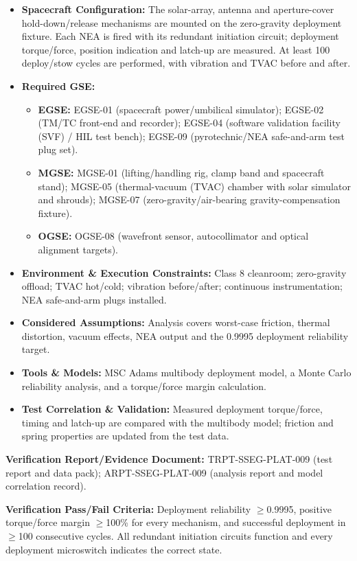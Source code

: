 \begin{itemize}
\item \textbf{Spacecraft Configuration:} The solar-array, antenna and aperture-cover hold-down/release mechanisms are mounted on the zero-gravity deployment fixture. Each NEA is fired with its redundant initiation circuit; deployment torque/force, position indication and latch-up are measured. At least 100 deploy/stow cycles are performed, with vibration and TVAC before and after.
\item \textbf{Required GSE:}
\begin{itemize}
\item \textbf{EGSE:} EGSE-01 (spacecraft power/umbilical simulator); EGSE-02 (TM/TC front-end and recorder); EGSE-04 (software validation facility (SVF) / HIL test bench); EGSE-09 (pyrotechnic/NEA safe-and-arm test plug set).
\item \textbf{MGSE:} MGSE-01 (lifting/handling rig, clamp band and spacecraft stand); MGSE-05 (thermal-vacuum (TVAC) chamber with solar simulator and shrouds); MGSE-07 (zero-gravity/air-bearing gravity-compensation fixture).
\item \textbf{OGSE:} OGSE-08 (wavefront sensor, autocollimator and optical alignment targets).
\end{itemize}
\item \textbf{Environment \& Execution Constraints:} Class 8 cleanroom; zero-gravity offload; TVAC hot/cold; vibration before/after; continuous instrumentation; NEA safe-and-arm plugs installed.
\item \textbf{Considered Assumptions:} Analysis covers worst-case friction, thermal distortion, vacuum effects, NEA output and the 0.9995 deployment reliability target.
\item \textbf{Tools \& Models:} MSC Adams multibody deployment model, a Monte Carlo reliability analysis, and a torque/force margin calculation.
\item \textbf{Test Correlation \& Validation:} Measured deployment torque/force, timing and latch-up are compared with the multibody model; friction and spring properties are updated from the test data.
\end{itemize}
\par\textbf{Verification Report/Evidence Document:} TRPT-SSEG-PLAT-009 (test report and data pack); ARPT-SSEG-PLAT-009 (analysis report and model correlation record).
\par\textbf{Verification Pass/Fail Criteria:} Deployment reliability $\ge$0.9995, positive torque/force margin $\ge$100\% for every mechanism, and successful deployment in $\ge$100 consecutive cycles. All redundant initiation circuits function and every deployment microswitch indicates the correct state.
\par\medskip
